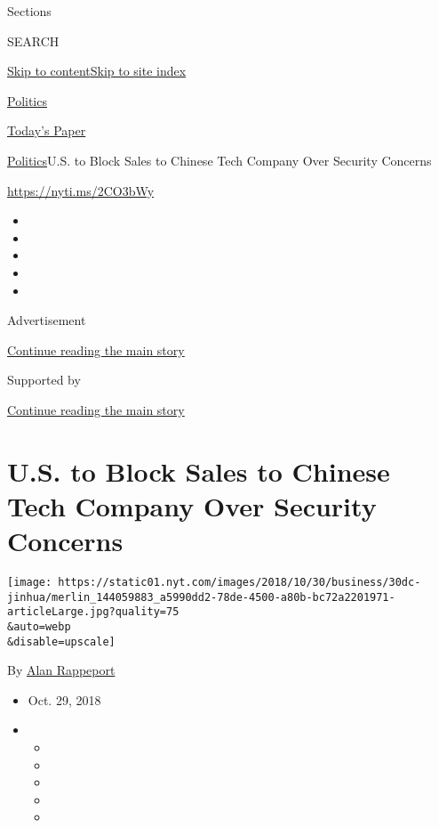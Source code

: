 Sections

SEARCH

\protect\hyperlink{site-content}{Skip to
content}\protect\hyperlink{site-index}{Skip to site index}

\href{https://www.nytimes.com/section/politics}{Politics}

\href{https://myaccount.nytimes.com/auth/login?response_type=cookie\&client_id=vi}{}

\href{https://www.nytimes.com/section/todayspaper}{Today's Paper}

\href{/section/politics}{Politics}\textbar{}U.S. to Block Sales to
Chinese Tech Company Over Security Concerns

\url{https://nyti.ms/2CO3bWy}

\begin{itemize}
\item
\item
\item
\item
\item
\end{itemize}

Advertisement

\protect\hyperlink{after-top}{Continue reading the main story}

Supported by

\protect\hyperlink{after-sponsor}{Continue reading the main story}

\hypertarget{us-to-block-sales-to-chinese-tech-company-over-security-concerns}{%
\section{U.S. to Block Sales to Chinese Tech Company Over Security
Concerns}\label{us-to-block-sales-to-chinese-tech-company-over-security-concerns}}

\texttt{[image: https://static01.nyt.com/images/2018/10/30/business/30dc-jinhua/merlin\_144059883\_a5990dd2-78de-4500-a80b-bc72a2201971-articleLarge.jpg?quality=75\\\&auto=webp\\\&disable=upscale]}

By \href{https://www.nytimes.com/by/alan-rappeport}{Alan Rappeport}

\begin{itemize}
\item
  Oct. 29, 2018
\item
  \begin{itemize}
  \item
  \item
  \item
  \item
  \item
  \end{itemize}
\end{itemize}

